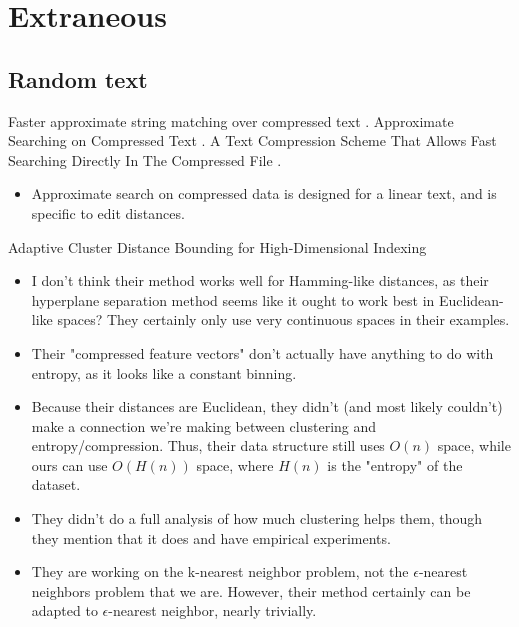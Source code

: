 \documentclass{amsbook}
\theoremstyle{definition}
\theoremstyle{remark}
\numberwithin{equation}{section}
\begin{document}



\appendix
\chapter{Extraneous}
\section{Random text}

Faster approximate string matching over compressed text \cite{navarro2001faster}.
Approximate Searching on Compressed Text \cite{perez2005approximate}.
A Text Compression Scheme That Allows Fast Searching Directly In The Compressed File \cite{manber93atext}.
\begin{itemize}
\item Approximate search on compressed data is designed for a linear text, and is specific to edit distances.
\end{itemize}

Adaptive Cluster Distance Bounding for High-Dimensional Indexing \cite{ramaswamy2011adaptive}
\begin{itemize}
\item I don't think their method works well for Hamming-like distances, as
   their hyperplane separation method seems like it ought to work best
   in Euclidean-like spaces? They certainly only use very continuous
   spaces in their examples.
\item Their "compressed feature vectors" don't actually have anything to do
   with entropy, as it looks like a constant binning.
\item Because their distances are Euclidean, they didn't (and most likely
   couldn't) make a connection we're making between clustering and
   entropy/compression. Thus, their data structure still uses $O(n)$
   space, while ours can use $O(H(n))$ space, where $H(n)$ is the "entropy"
   of the dataset.
\item They didn't do a full analysis of how much clustering helps them,
   though they mention that it does and have empirical experiments.
\item They are working on the k-nearest neighbor problem, not the
   $\epsilon$-nearest neighbors problem that we are. However, their method
   certainly can be adapted to $\epsilon$-nearest neighbor, nearly
   trivially.
\end{itemize}
\end{document}
